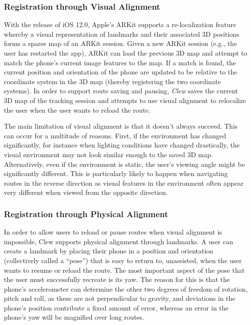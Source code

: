 \documentclass[chi]{sigchi}
\begin{document}
\subsubsection{Registration through Visual Alignment}
With the release of iOS 12.0, Apple's ARKit supports a re-localization feature whereby a visual representation of landmarks and their associated 3D positions forms a sparse map of an ARKit session.  Given a new ARKit session (e.g., the user has restarted the app), ARKit can load the previous 3D map and attempt to match the phone's current image features to the map.  If a match is found, the current position and orientation of the phone are updated to be relative to the coordinate system in the 3D map (thereby registering the two coordinate systems).  In order to support route saving and pausing, \emph{Clew} saves the current 3D map of the tracking session and attempts to use visual alignment to relocalize the user when the user wants to reload the route.

The main limitation of visual alignment is that it doesn't always succeed.  This can occur for a multitude of reasons.  First, if the environment has changed significantly, for instance when lighting conditions have changed drastically, the visual environment may not look similar enough to the saved 3D map.  Alternatively, even if the environment is static, the user's viewing angle might be significantly different.  This is particularly likely to happen when navigating routes in the reverse direction as visual features in the environment often appear very different when viewed from the opposite direction.


\subsubsection{Registration through Physical Alignment}

In order to allow users to reload or pause routes when visual alignment is impossible, Clew supports physical alignment through landmarks.  A user can create a landmark by placing their phone in a position and orientation (collectively called a ``pose'') that is easy to return to, unassisted, when the user wants to resume or reload the route.  The most important aspect of the pose that the user must successfully recreate is its yaw.  The reason for this is that the phone's accelerometer can determine the other two degrees of freedom of rotation, pitch and roll, as these are not perpendicular to gravity, and deviations in the phone's position contribute a fixed amount of error, whereas an error in the phone's yaw will be magnified over long routes.
\end{document}
